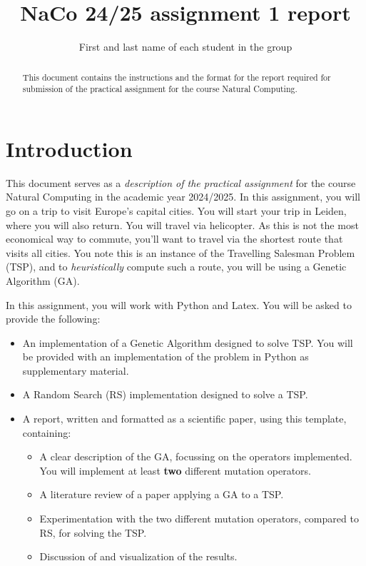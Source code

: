 \documentclass[runningheads]{llncs}
\begin{document}
%
\title{NaCo 24/25 assignment 1 report}

\author{First and last name of each student in the group}
%

%
\maketitle %
%

\begin{abstract}
This document contains the instructions and the format for the report required for submission of the practical assignment for the course Natural Computing. 
\end{abstract}

\section{Introduction}
This document serves as a \textit{description of the practical assignment} for the course Natural Computing in the academic year 2024/2025. In this assignment, you will go on a trip to visit Europe's capital cities. You will start your trip in Leiden, where you will also return. You will travel via helicopter. As this is not the most economical way to commute, you'll want to travel via the shortest route that visits all cities. You note this is an instance of the Travelling Salesman Problem (TSP), and to \emph{heuristically} compute such a route, you will be using a Genetic Algorithm (GA). 

In this assignment, you will work with Python and Latex. You will be asked to provide the following:
\begin{itemize}
   \item An implementation of a Genetic Algorithm designed to solve TSP. You will be provided with an implementation of the problem in Python as supplementary material. 
   \item A Random Search (RS) implementation designed to solve a TSP. 
   \item A report, written and formatted as a scientific paper, using this template, containing:
\begin{itemize}
    \item A clear description of the GA, focussing on the operators implemented. You will implement at least \textbf{two} different mutation operators. 
    \item A literature review of a paper applying a GA to a TSP.
    \item Experimentation with the two different mutation operators, compared to RS, for solving the TSP.  
    \item Discussion of and visualization of the results.
\end{itemize}
\end{itemize}
\end{document}
